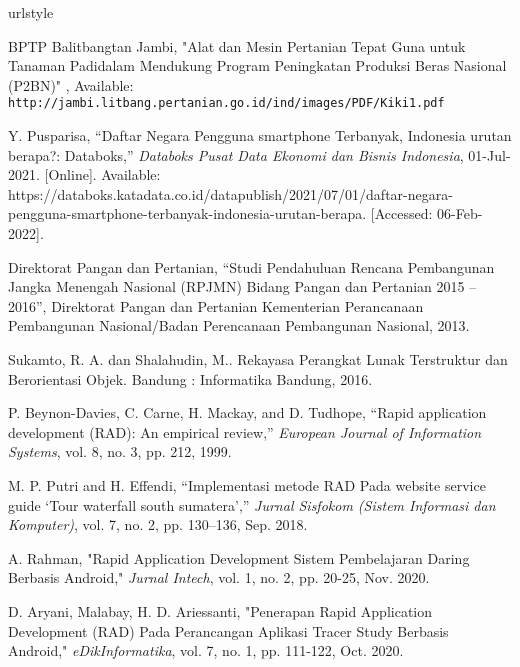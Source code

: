 \begin{thebibliography}{7}
%
\providecommand{\natexlab}[1]{#1}
\providecommand{\url}[1]{\texttt{#1}}
\expandafter\ifx\csname urlstyle\endcsname\relax
  \providecommand{\doi}[1]{doi: #1}\else
  \providecommand{\doi}{doi: \begingroup \urlstyle{rm}\Url}\fi


BPTP Balitbangtan Jambi, "Alat dan Mesin Pertanian Tepat Guna untuk Tanaman Padidalam Mendukung Program Peningkatan Produksi Beras Nasional (P2BN)"
, Available: \url{http://jambi.litbang.pertanian.go.id/ind/images/PDF/Kiki1.pdf}

Y. Pusparisa, “Daftar Negara Pengguna smartphone Terbanyak, Indonesia urutan berapa?: Databoks,” \emph{Databoks Pusat Data Ekonomi dan Bisnis Indonesia}, 01-Jul-2021. [Online]. Available: https://databoks.katadata.co.id/datapublish/2021/07/01/daftar-negara-pengguna-smartphone-terbanyak-indonesia-urutan-berapa. [Accessed: 06-Feb-2022]. 

Direktorat Pangan dan Pertanian, “Studi Pendahuluan Rencana Pembangunan Jangka Menengah Nasional (RPJMN) Bidang Pangan dan Pertanian 2015 – 2016”, Direktorat Pangan dan Pertanian Kementerian Perancanaan Pembangunan Nasional/Badan Perencanaan Pembangunan Nasional, 2013.

Sukamto, R. A. dan Shalahudin, M.. Rekayasa Perangkat Lunak Terstruktur dan Berorientasi Objek. Bandung : Informatika Bandung, 2016.

P. Beynon-Davies, C. Carne, H. Mackay, and D. Tudhope, “Rapid application development (RAD): An empirical review,” \emph{European Journal of Information Systems}, vol. 8, no. 3, pp. 212, 1999. 

M. P. Putri and H. Effendi, “Implementasi metode RAD Pada website  service guide ‘Tour waterfall south sumatera’,” \emph{Jurnal Sisfokom (Sistem Informasi dan Komputer)}, vol. 7, no. 2, pp. 130–136, Sep. 2018. 

A. Rahman, "Rapid Application Development Sistem Pembelajaran Daring Berbasis Android," \emph{Jurnal Intech}, vol. 1, no. 2, pp. 20-25, Nov. 2020.

D. Aryani, Malabay, H. D. Ariessanti, "Penerapan Rapid Application Development (RAD) Pada Perancangan Aplikasi Tracer Study Berbasis Android," \emph{eDikInformatika}, vol. 7, no. 1, pp. 111-122, Oct. 2020.


\end{thebibliography}
